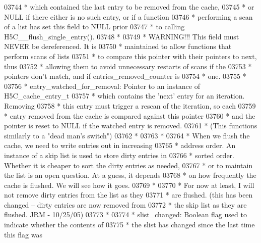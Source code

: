 \begin{DoxyCode}
03744 \textcolor{comment}{ *      which contained the last entry to be removed from the cache,}
03745 \textcolor{comment}{ *      or NULL if there either is no such entry, or if a function}
03746 \textcolor{comment}{ *      performing a scan of a list has set this field to NULL prior}
03747 \textcolor{comment}{ *      to calling H5C\_\_flush\_single\_entry().}
03748 \textcolor{comment}{ *}
03749 \textcolor{comment}{ *      WARNING!!! This field must NEVER be dereferenced.  It is }
03750 \textcolor{comment}{ *      maintained to allow functions that perform scans of lists}
03751 \textcolor{comment}{ *      to compare this pointer with their pointers to next, thus}
03752 \textcolor{comment}{ *      allowing them to avoid unnecessary restarts of scans if the}
03753 \textcolor{comment}{ *      pointers don't match, and if entries\_removed\_counter is }
03754 \textcolor{comment}{ *      one.}
03755 \textcolor{comment}{ *}
03756 \textcolor{comment}{ * entry\_watched\_for\_removal:   Pointer to an instance of H5C\_cache\_entry\_t}
03757 \textcolor{comment}{ *      which contains the 'next' entry for an iteration.  Removing}
03758 \textcolor{comment}{ *              this entry must trigger a rescan of the iteration, so each}
03759 \textcolor{comment}{ *              entry removed from the cache is compared against this pointer}
03760 \textcolor{comment}{ *              and the pointer is reset to NULL if the watched entry is removed.}
03761 \textcolor{comment}{ *              (This functions similarly to a "dead man's switch")}
03762 \textcolor{comment}{ *}
03763 \textcolor{comment}{ *}
03764 \textcolor{comment}{ * When we flush the cache, we need to write entries out in increasing}
03765 \textcolor{comment}{ * address order.  An instance of a skip list is used to store dirty entries in}
03766 \textcolor{comment}{ * sorted order.  Whether it is cheaper to sort the dirty entries as needed,}
03767 \textcolor{comment}{ * or to maintain the list is an open question.  At a guess, it depends}
03768 \textcolor{comment}{ * on how frequently the cache is flushed.  We will see how it goes.}
03769 \textcolor{comment}{ *}
03770 \textcolor{comment}{ * For now at least, I will not remove dirty entries from the list as they}
03771 \textcolor{comment}{ * are flushed. (this has been changed -- dirty entries are now removed from}
03772 \textcolor{comment}{ * the skip list as they are flushed.  JRM - 10/25/05)}
03773 \textcolor{comment}{ *}
03774 \textcolor{comment}{ * slist\_changed: Boolean flag used to indicate whether the contents of }
03775 \textcolor{comment}{ *      the slist has changed since the last time this flag was}

\end{DoxyCode}
